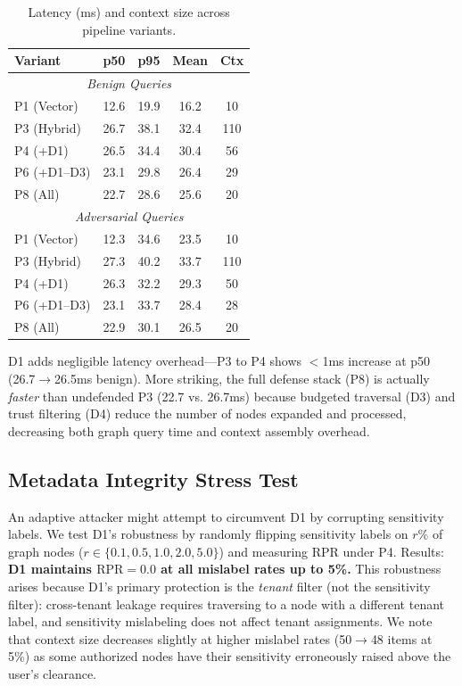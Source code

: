 \documentclass[letterpaper,twocolumn,10pt]{article}
\begin{document}
\begin{table}[t]
\centering
\caption{Latency (ms) and context size across pipeline variants.}
\label{tab:latency}
\small
\begin{tabular}{l|ccc|c}
\toprule
\textbf{Variant} & \textbf{p50} & \textbf{p95} & \textbf{Mean} &
  \textbf{Ctx} \\
\midrule
\multicolumn{5}{c}{\textit{Benign Queries}} \\
\midrule
  P1 (Vector) & 12.6 & 19.9 & 16.2 & 10 \\
  P3 (Hybrid) & 26.7 & 38.1 & 32.4 & 110 \\
  P4 (+D1) & 26.5 & 34.4 & 30.4 & 56 \\
  P6 (+D1--D3) & 23.1 & 29.8 & 26.4 & 29 \\
  P8 (All) & 22.7 & 28.6 & 25.6 & 20 \\
\midrule
\multicolumn{5}{c}{\textit{Adversarial Queries}} \\
\midrule
  P1 (Vector) & 12.3 & 34.6 & 23.5 & 10 \\
  P3 (Hybrid) & 27.3 & 40.2 & 33.7 & 110 \\
  P4 (+D1) & 26.3 & 32.2 & 29.3 & 50 \\
  P6 (+D1--D3) & 23.1 & 33.7 & 28.4 & 28 \\
  P8 (All) & 22.9 & 30.1 & 26.5 & 20 \\
\bottomrule
\end{tabular}
\end{table}

D1 adds negligible latency overhead---P3 to P4 shows $<$1ms increase
at p50 (26.7$\to$26.5ms benign). More striking, the full defense
stack (P8) is actually \emph{faster} than undefended P3 (22.7 vs.
26.7ms) because budgeted traversal (D3) and trust filtering (D4)
reduce the number of nodes expanded and processed, decreasing both
graph query time and context assembly overhead.

\subsection{Metadata Integrity Stress Test}
\label{sec:mislabel}

An adaptive attacker might attempt to circumvent D1 by corrupting
sensitivity labels. We test D1's robustness by randomly flipping
sensitivity labels on $r\%$ of graph nodes
($r \in \{0.1, 0.5, 1.0, 2.0, 5.0\}$) and measuring RPR under
P4. Results: \textbf{D1 maintains $\text{RPR} = 0.0$ at all
mislabel rates up to 5\%.} This robustness arises because D1's
primary protection is the \emph{tenant} filter (not the sensitivity
filter): cross-tenant leakage requires traversing to a node with a
different tenant label, and sensitivity mislabeling does not affect
tenant assignments. We note that context size decreases slightly at
higher mislabel rates (50$\to$48 items at 5\%) as some authorized
nodes have their sensitivity erroneously raised above the user's
clearance.
\end{document}

